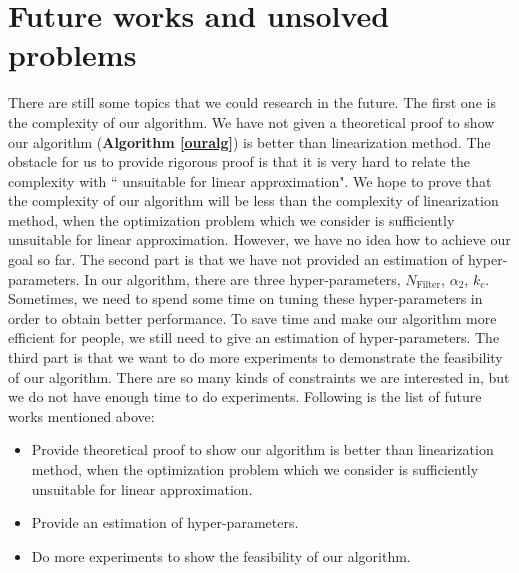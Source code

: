 \documentclass[conference]{IEEEtran}
\begin{document}
\section{Future works and unsolved problems}
There are still some topics that we could research in the future. The first one is the complexity of our algorithm. We have not given a theoretical proof to show our algorithm (\textbf{Algorithm \ref{ouralg}}) is better than linearization method. The obstacle for us to provide rigorous proof is that it is very hard to relate the complexity with `` unsuitable for linear approximation". We hope to prove that the complexity of our algorithm will be less than the complexity of linearization method, when the optimization problem which we consider is sufficiently unsuitable for linear approximation. However, we have no idea how to achieve our goal so far.
The second part is that we have not provided an estimation of hyper-parameters. In our algorithm, there are three hyper-parameters, $N_{\text{Filter}}$, $\alpha_2$, $k_{c}$. Sometimes, we need to spend some time on tuning these hyper-parameters in order to obtain better performance. To save time and make our algorithm more efficient for people, we still need to give an estimation of hyper-parameters.
The third part is that we want to do more experiments to demonstrate the feasibility of our algorithm. There are so many kinds of constraints we are interested in, but we do not have enough time to do experiments. 
Following is the list of future works mentioned above:
\begin{itemize}
    \item Provide theoretical proof to show our algorithm is better than linearization method,  when the optimization problem which we consider is sufficiently unsuitable for linear approximation.
    \item Provide an estimation of hyper-parameters.
    \item Do more experiments to show the feasibility of our algorithm.
\end{itemize}



\end{document}
